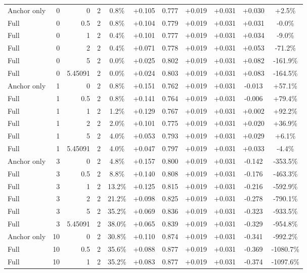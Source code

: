 \begin{table}[htbp]
\begin{tabular}{lrrrccccccc}
Anchor only & 0 & 0 & 2 & 0.8\% & +0.105 & 0.777 & +0.019 & +0.031 & +0.030 & +2.5\% \\
Full & 0 & 0.5 & 2 & 0.8\% & +0.104 & 0.779 & +0.019 & +0.031 & +0.031 & -0.0\% \\
Full & 0 & 1 & 2 & 0.4\% & +0.101 & 0.777 & +0.019 & +0.031 & +0.034 & -9.0\% \\
Full & 0 & 2 & 2 & 0.4\% & +0.071 & 0.778 & +0.019 & +0.031 & +0.053 & -71.2\% \\
Full & 0 & 5 & 2 & 0.0\% & +0.025 & 0.802 & +0.019 & +0.031 & +0.082 & -161.9\% \\
Full & 0 & 5.45091 & 2 & 0.0\% & +0.024 & 0.803 & +0.019 & +0.031 & +0.083 & -164.5\% \\
Anchor only & 1 & 0 & 2 & 0.8\% & +0.151 & 0.762 & +0.019 & +0.031 & -0.013 & +57.1\% \\
Full & 1 & 0.5 & 2 & 0.8\% & +0.141 & 0.764 & +0.019 & +0.031 & -0.006 & +79.4\% \\
Full & 1 & 1 & 2 & 1.2\% & +0.129 & 0.767 & +0.019 & +0.031 & +0.002 & +92.2\% \\
Full & 1 & 2 & 2 & 2.0\% & +0.101 & 0.775 & +0.019 & +0.031 & +0.020 & +36.9\% \\
Full & 1 & 5 & 2 & 4.0\% & +0.053 & 0.793 & +0.019 & +0.031 & +0.029 & +6.1\% \\
Full & 1 & 5.45091 & 2 & 4.0\% & +0.047 & 0.797 & +0.019 & +0.031 & +0.033 & -4.4\% \\
Anchor only & 3 & 0 & 2 & 4.8\% & +0.157 & 0.800 & +0.019 & +0.031 & -0.142 & -353.5\% \\
Full & 3 & 0.5 & 2 & 8.8\% & +0.140 & 0.808 & +0.019 & +0.031 & -0.176 & -463.3\% \\
Full & 3 & 1 & 2 & 13.2\% & +0.125 & 0.815 & +0.019 & +0.031 & -0.216 & -592.9\% \\
Full & 3 & 2 & 2 & 21.2\% & +0.098 & 0.825 & +0.019 & +0.031 & -0.278 & -790.1\% \\
Full & 3 & 5 & 2 & 35.2\% & +0.069 & 0.836 & +0.019 & +0.031 & -0.323 & -933.5\% \\
Full & 3 & 5.45091 & 2 & 38.0\% & +0.065 & 0.839 & +0.019 & +0.031 & -0.329 & -954.8\% \\
Anchor only & 10 & 0 & 2 & 30.8\% & +0.110 & 0.874 & +0.019 & +0.031 & -0.341 & -992.2\% \\
Full & 10 & 0.5 & 2 & 35.6\% & +0.088 & 0.877 & +0.019 & +0.031 & -0.369 & -1080.7\% \\
Full & 10 & 1 & 2 & 35.2\% & +0.083 & 0.877 & +0.019 & +0.031 & -0.374 & -1097.6\% \\

\end{tabular}
\end{table}
